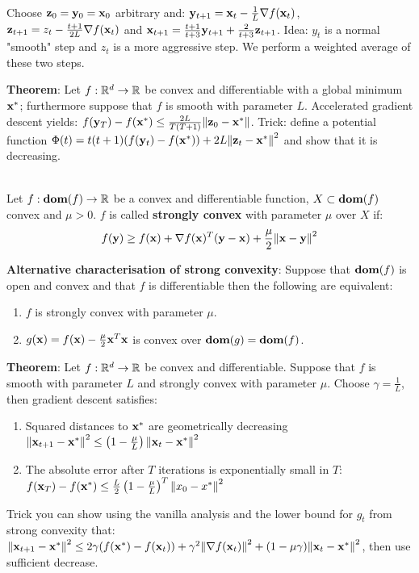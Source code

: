 \begin{framed}
    Choose $\mathbf{z}_0 = \mathbf{y}_0 = \mathbf{x}_0$ arbitrary and: $\mathbf{y}_{t+1} = \mathbf{x}_t - \frac{1}{L}\nabla f(\mathbf{x}_t)$, $\mathbf{z}_{t+1} = z_t - \frac{t+1}{2L}\nabla f(\mathbf{x}_t)$ and $\mathbf{x}_{t+1} = \frac{t+1}{t+3}\mathbf{y}_{t+1} + \frac{2}{t+3}\mathbf{z}_{t+1}$. Idea: $y_t$ is a normal "smooth" step and $z_t$ is a more aggressive step. We perform a weighted average of these two steps.
\end{framed}
\textbf{Theorem}: Let $f : \mathbb{R}^d \rightarrow \mathbb{R}$ be convex and differentiable with a global minimum $\mathbf{x}^*$; furthermore suppose that $f$ is smooth with parameter $L$. Accelerated gradient descent yields: $f(\mathbf{y}_T) - f(\mathbf{x}^*) \leq \frac{2L}{T(T+1)}\norm{\mathbf{z}_0 - \mathbf{x}^*}$. Trick: define a potential function $\Phi(t) = t(t+1)(f(\mathbf{y}_t) - f(\mathbf{x}^*)) + 2L \norm{\mathbf{z}_t - \mathbf{x}^*}^2$ and show that it is decreasing. \\
 \\
\begin{framed}
    Let $f : \textbf{dom}(f) \rightarrow \mathbb{R}$ be a convex and differentiable function, $X \subset \textbf{dom}(f)$ convex and $\mu > 0$. $f$ is called \textbf{strongly convex} with parameter $\mu$ over $X$ if:
    \begin{align*}
        f(\mathbf{y}) \geq f(\mathbf{x}) + \nabla f(\mathbf{x})^T (\mathbf{y} - \mathbf{x}) + \frac{\mu}{2}\norm{\mathbf{x} - \mathbf{y}}^2
    \end{align*}
\end{framed}
\textbf{Alternative characterisation of strong convexity}: Suppose that $\textbf{dom}(f)$ is open and convex and that $f$ is differentiable then the following are equivalent:
\begin{enumerate}[label=(\roman*), topsep=0pt,itemsep=0ex,partopsep=0ex,parsep=0ex]  
    \itemsep0em
    \item $f$ is strongly convex with parameter $\mu$.
    \item $g(\mathbf{x}) = f(\mathbf{x}) - \frac{\mu}{2} \mathbf{x}^T \mathbf{x}$ is convex over $\textbf{dom}(g) = \textbf{dom}(f)$.
\end{enumerate}
\textbf{Theorem}: Let $f: \mathbb{R}^d \rightarrow \mathbb{R}$ be convex and differentiable. Suppose that $f$ is smooth with parameter $L$ and strongly convex with parameter $\mu$. Choose $\gamma = \frac{1}{L}$, then gradient descent satisfies:
\begin{enumerate}[label=(\roman*), topsep=0pt,itemsep=0ex,partopsep=0ex,parsep=0ex]
    \itemsep0em
    \item Squared distances to $\mathbf{x}^*$ are geometrically decreasing $\norm{\mathbf{x}_{t+1} -\mathbf{x}^*}^2 \leq \left(1 - \frac{\mu}{L}\right)\norm{\mathbf{x}_t - \mathbf{x}^*}^2$
    \item The absolute error after $T$ iterations is exponentially small in $T$: $f(\mathbf{x}_T) - f(\mathbf{x}^*) \leq \frac{L}{2}\left(1 - \frac{\mu}{L}\right)^T \norm{x_0 - x^*}^2$
\end{enumerate}
Trick you can show using the vanilla analysis and the lower bound for $g_t$ from strong convexity that: $\norm{\mathbf{x}_{t+1}- \mathbf{x}^*}^2 \leq 2 \gamma (f(\mathbf{x}^*) - f(\mathbf{x}_t))+\gamma^2 \norm{\nabla f(\mathbf{x}_t)}^2 + (1 - \mu \gamma)\norm{\mathbf{x}_t - \mathbf{x}^*}^2$, then use sufficient decrease. \\
